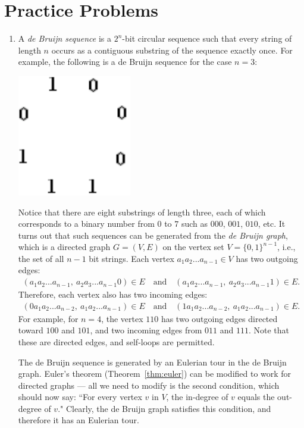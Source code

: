\documentclass[11pt]{article}
\newcounter{thm}
\begin{document}
\section{Practice Problems}\label{scn:problems}
\begin{enumerate}

\item A {\it de Bruijn sequence\/} is a $2^n$-bit circular sequence such
that every string of length $n$ occurs as a contiguous substring of
the sequence exactly once.  For example, the following is a de Bruijn
sequence for the case $n=3$:
\begin{center}
\includegraphics[scale=0.7]{debruijn}
\end{center}
Notice that there are eight substrings of length three, each of which
corresponds to a binary number from $0$ to $7$ such as $000$, $001$, $010$, etc. It turns out that such
sequences can be generated from the {\it de Bruijn graph}, which is a directed graph $G=(V,E)$ on the vertex set $V=\{0,1\}^{n-1}$, i.e., the set of all $n-1$ bit strings.
Each vertex $a_1a_2...a_{n-1} \in V$ has two outgoing
edges: 
\begin{eqnarray*}
    (a_1a_2...a_{n-1}, ~ a_2a_3...a_{n-1}0) \in E ~~~ \text{ and } ~~~
(a_1a_2...a_{n-1}, ~a_2a_3...a_{n-1}1) \in E.
\end{eqnarray*}
Therefore, each
vertex also has two incoming edges: 
\begin{eqnarray*}
    (0a_1a_2...a_{n-2},~a_1a_2...a_{n-1}) \in E ~~~ \text{ and } ~~~ 
(1a_1a_2...a_{n-2},~ a_1a_2...a_{n-1}) \in E.
\end{eqnarray*}
For example, for $n = 4$, the vertex $110$ has two outgoing edges directed toward $100$ and $101$, and two incoming edges from $011$ and $111$. Note that these are directed edges, and self-loops are permitted.

The de Bruijn sequence is generated by an Eulerian tour in the de Bruijn graph. Euler's
theorem (Theorem~\ref{thm:euler}) can be modified to work for directed graphs ---
all we need to modify is the second condition, which should now say: ``For
every vertex $v$ in $V$, the in-degree of $v$ equals the out-degree of $v.$"
Clearly, the de Bruijn graph satisfies this condition, and therefore it has an
Eulerian tour.


\end{enumerate}
\end{document}
